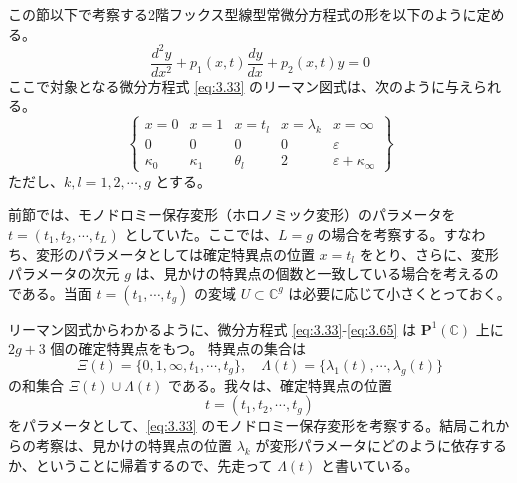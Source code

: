 \begin{story}
\begin{definition}[ガルニエ系を導くフックス型常微分方程式とリーマン図式]
この節以下で考察する2階フックス型線型常微分方程式の形を以下のように定める。
\begin{equation}
\frac{d^2 y}{dx^2} + p_1(x, t) \frac{dy}{dx} + p_2(x, t) y = 0 \label{eq:3.33}
\end{equation}
ここで対象となる微分方程式 \eqref{eq:3.33} のリーマン図式は、次のように与えられる。
\begin{equation}
\left\{
\begin{array}{ccccc}
x=0 & x=1 & x=t_l & x=\lambda_k & x=\infty \\
0 & 0 & 0 & 0 & \varepsilon \\
\kappa_0 & \kappa_1 & \theta_l & 2 & \varepsilon+\kappa_\infty
\end{array}
\right\} \label{eq:3.65}
\end{equation}
ただし、$k, l = 1, 2, \cdots, g$ とする。
\end{definition}

前節では、モノドロミー保存変形（ホロノミック変形）のパラメータを $t = (t_1, t_2, \cdots, t_L)$ としていた。ここでは、$L=g$ の場合を考察する。すなわち、変形のパラメータとしては確定特異点の位置 $x=t_l$ をとり、さらに、変形パラメータの次元 $g$ は、見かけの特異点の個数と一致している場合を考えるのである。当面 $t=(t_1, \cdots, t_g)$ の変域 $U \subset \mathbb{C}^g$ は必要に応じて小さくとっておく。

リーマン図式からわかるように、微分方程式 \eqref{eq:3.33}-\eqref{eq:3.65} は $\mathbf{P}^1(\mathbb{C})$ 上に $2g+3$ 個の確定特異点をもつ。
特異点の集合は
\begin{equation*}
\Xi(t) = \{0, 1, \infty, t_1, \cdots, t_g\}, \quad \Lambda(t) = \{\lambda_1(t), \cdots, \lambda_g(t)\}
\end{equation*}
の和集合 $\Xi(t) \cup \Lambda(t)$ である。我々は、確定特異点の位置
\begin{equation*}
t = (t_1, t_2, \cdots, t_g)
\end{equation*}
をパラメータとして、\eqref{eq:3.33} のモノドロミー保存変形を考察する。結局これからの考察は、見かけの特異点の位置 $\lambda_k$ が変形パラメータにどのように依存するか、ということに帰着するので、先走って $\Lambda(t)$ と書いている。
\end{story}

